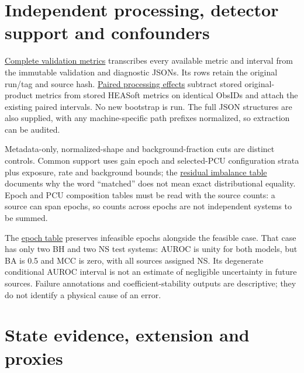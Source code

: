 \documentclass[final,5p,authoryear,nopreprintline]{elsarticle}
\begin{document}
\section{Independent processing, detector support and confounders}

\href{https://github.com/YouhanCW/bhns-source-generalization/blob/3c5bb50b1820ef89f816fc2f4da0fb6c69f359f7/manuscript/supplement/tables/S4_all_validation_metrics_tidy.csv}{Complete validation metrics} transcribes every available metric and interval from the immutable validation and diagnostic JSONs. Its rows retain the original run/tag and source hash. \href{https://github.com/YouhanCW/bhns-source-generalization/blob/3c5bb50b1820ef89f816fc2f4da0fb6c69f359f7/manuscript/supplement/tables/S4_paired_processing_effects.csv}{Paired processing effects} subtract stored original-product metrics from stored HEASoft metrics on identical ObsIDs and attach the existing paired intervals. No new bootstrap is run. The full JSON structures are also supplied, with any machine-specific path prefixes normalized, so extraction can be audited.

Metadata-only, normalized-shape and background-fraction cuts are distinct controls. Common support uses gain epoch and selected-PCU configuration strata plus exposure, rate and background bounds; the \href{https://github.com/YouhanCW/bhns-source-generalization/blob/3c5bb50b1820ef89f816fc2f4da0fb6c69f359f7/manuscript/supplement/tables/S4_residual_imbalance.csv}{residual imbalance table} documents why the word ``matched'' does not mean exact distributional equality. Epoch and PCU composition tables must be read with the source counts: a source can span epochs, so counts across epochs are not independent systems to be summed.

The \href{https://github.com/YouhanCW/bhns-source-generalization/blob/3c5bb50b1820ef89f816fc2f4da0fb6c69f359f7/manuscript/supplement/tables/S4_epoch_holdout.csv}{epoch table} preserves infeasible epochs alongside the feasible case. That case has only two BH and two NS test systems: AUROC is unity for both models, but BA is 0.5 and MCC is zero, with all sources assigned NS. Its degenerate conditional AUROC interval is not an estimate of negligible uncertainty in future sources. Failure annotations and coefficient-stability outputs are descriptive; they do not identify a physical cause of an error.

\section{State evidence, extension and proxies}
\end{document}
